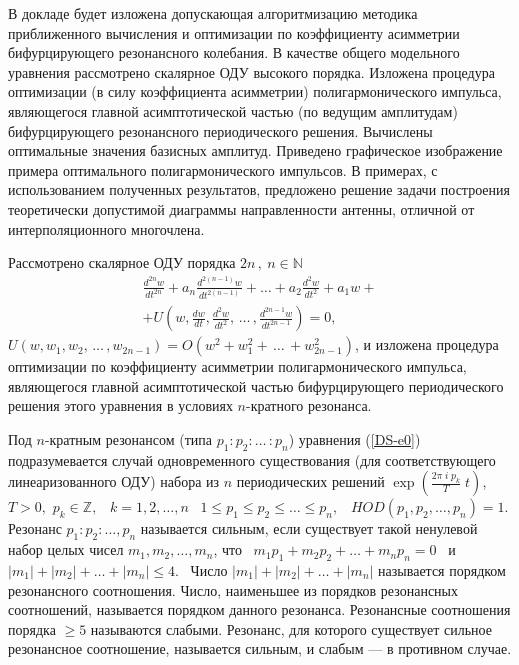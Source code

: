


\vzmscaption


 В докладе будет изложена допускающая алгоритмизацию методика приближенного вычисления и оптимизации по коэффициенту асимметрии бифурцирующего резонансного колебания. В качестве общего модельного уравнения рассмотрено скалярное ОДУ высокого порядка. Изложена  процедура оптимизации (в силу коэффициента асимметрии) полигармонического импульса, являющегося главной асимптотической частью (по ведущим амплитудам) бифурцирующего резонансного периодического решения. Вычислены оптимальные значения базисных амплитуд. Приведено графическое изображение примера оптимального полигармонического импульсов. В примерах, с использованием полученных результатов, предложено решение задачи построения теоретически допустимой диаграммы направленности антенны, отличной от интерполяционного многочлена.


Рассмотрено скалярное ОДУ порядка
$2n\,, \ n\in \mathbb{N}$
{\small
\begin{multline}\label{DS-e0}
\frac{d^{2n}w}{dt^{2n}}+ a_n\frac{d^{2(n-1)}w}{dt^{2(n-1)}}+ \dots +
a_2\frac{d^2w}{dt^2}+a_1w +
\\+
U \left(w,\frac{dw}{dt},
\frac{d^2w}{dt^2},\, \dots\,, \frac{d^{2n-1}w}{dt^{2n-1}}\right)
= 0,
\end{multline}}
$U(w,w_1, w_2,\, \dots\,, w_{2n-1})=O(w^2 + w_1^2+\, \dots\,
+w_{2n-1}^2)$, и изложена процедура оптимизации по коэффициенту
асимметрии полигармонического импульса, являющегося главной
асимптотической частью бифурцирующего периодического решения этого
уравнения в условиях $n$-кратного резонанса.

Под $n$-кратным резонансом (типа $p_1:p_2: \dots \,:p_n$) уравнения
(\ref{DS-e0}) подразумевается случай одновременного существования
(для соответствующего линеаризованного ОДУ) набора из $n$
периодических решений $\exp(\frac{2\pi\; i \;p_k}{T}\;t)$, \ $T >
0,$ $p_k\in \mathbb{Z},$ \ $k=1,2,\dots ,n$ \ $1\leqslant p_1 \leqslant p_2
\leqslant\dots \leqslant p_n,$ \ $HOD(p_1,p_2, \dots , p_n)=1$. Резонанс
$p_1:p_2:\dots , p_n$ называется сильным, если существует такой
ненулевой набор целых чисел $m_1,m_2,\dots , m_n$, что \
$m_1p_1+m_2p_2+ \dots + m_np_n=0$ \ и \ $|m_1|+|m_2|+ \dots +
|m_n|\leqslant 4.$ \ Число $|m_1|+|m_2|+ \dots + |m_n|$ называется
порядком резонансного соотношения. Число, наименьшее из порядков
резонансных соотношений, называется порядком данного резонанса.
Резонансные соотношения порядка $\geqslant 5$ называются слабыми.
Резонанс, для которого существует сильное резонансное соотношение,
называется сильным, и слабым --- в противном случае.

